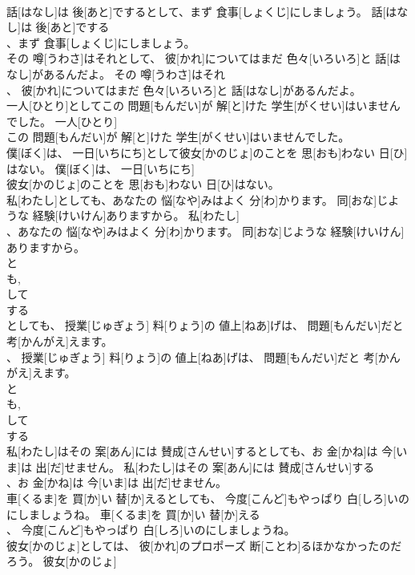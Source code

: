 \documentclass[8pt]{extreport}
\begin{document}
\begin{CJK}{UTF8}{min}
\\	話[はなし]は 後[あと]でするとして、まず 食事[しょくじ]にしましょう。	話[はなし]は 後[あと]でする
\\	、まず 食事[しょくじ]にしましょう。	
\\	その 噂[うわさ]はそれとして、 彼[かれ]についてはまだ 色々[いろいろ]と 話[はなし]があるんだよ。	その 噂[うわさ]はそれ
\\	、 彼[かれ]についてはまだ 色々[いろいろ]と 話[はなし]があるんだよ。	
\\	一人[ひとり]としてこの 問題[もんだい]が 解[と]けた 学生[がくせい]はいませんでした。	一人[ひとり]
\\	この 問題[もんだい]が 解[と]けた 学生[がくせい]はいませんでした。	
\\	僕[ぼく]は、 一日[いちにち]として彼女[かのじょ]のことを 思[おも]わない 日[ひ]はない。	僕[ぼく]は、 一日[いちにち]
\\	彼女[かのじょ]のことを 思[おも]わない 日[ひ]はない。	
\\	私[わたし]としても、あなたの 悩[なや]みはよく 分[わ]かります。 同[おな]じような 経験[けいけん]ありますから。	私[わたし]
\\	、あなたの 悩[なや]みはよく 分[わ]かります。 同[おな]じような 経験[けいけん]ありますから。	
\\	と 
\\	も, 
\\	して 
\\	する 
\\	としても、 授業[じゅぎょう] 料[りょう]の 値上[ねあ]げは、 問題[もんだい]だと 考[かんがえ]えます。	
\\	、 授業[じゅぎょう] 料[りょう]の 値上[ねあ]げは、 問題[もんだい]だと 考[かんがえ]えます。	
\\	と 
\\	も, 
\\	して 
\\	する 
\\	私[わたし]はその 案[あん]には 賛成[さんせい]するとしても、お 金[かね]は 今[いま]は 出[だ]せません。	私[わたし]はその 案[あん]には 賛成[さんせい]する
\\	、お 金[かね]は 今[いま]は 出[だ]せません。	
\\	車[くるま]を 買[か]い 替[か]えるとしても、 今度[こんど]もやっぱり 白[しろ]いのにしましょうね。	車[くるま]を 買[か]い 替[か]える
\\	、 今度[こんど]もやっぱり 白[しろ]いのにしましょうね。	
\\	彼女[かのじょ]としては、 彼[かれ]のプロポーズ 断[ことわ]るほかなかったのだろう。	彼女[かのじょ]

\end{CJK}
\end{document}

